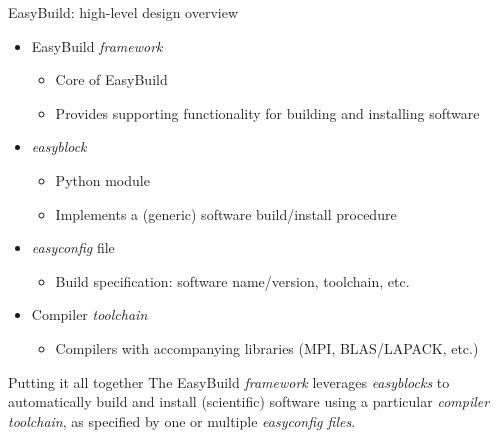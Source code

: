 \documentclass[10pt,xcolor={usenames,dvipsnames}]{beamer}
\begin{document}
\begin{frame}{EasyBuild: high-level design overview}
\begin{itemize}
    \item
        EasyBuild \emph{framework}
        \begin{itemize}
            \item
                Core of EasyBuild
            \item
                Provides supporting functionality for building and installing software
        \end{itemize}
    \item
        \emph{easyblock}
        \begin{itemize}
            \item
                Python module
            \item
                Implements a (generic) software build/install procedure
        \end{itemize}
    \item
        \emph{easyconfig} file
        \begin{itemize}
            \item
                Build specification: software name/version, toolchain, etc.
        \end{itemize}
    \item
        Compiler \emph{toolchain}
        \begin{itemize}
            \item
                Compilers with accompanying libraries (MPI, BLAS/LAPACK, etc.)
        \end{itemize}
\end{itemize}

\medskip\quad\quad
\begin{minipage}{0.9\textwidth}
    \begin{block}{Putting it all together}
        The EasyBuild \emph{framework} leverages \emph{easyblocks} to
        automatically build and install (scientific) software using a
        particular \emph{compiler toolchain}, as specified by one or multiple
        \emph{easyconfig files}.
    \end{block}
\end{minipage}
\end{frame}

\end{document}
